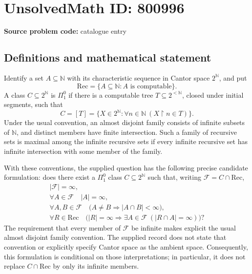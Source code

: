 \documentclass[11pt]{article}
\newcommand{\N}{\mathbb{N}}
\begin{document}
\section*{UnsolvedMath ID: 800996}
\textbf{Source problem code:} catalogue entry
\subsection{Definitions and mathematical statement}
Identify a set \(A\subseteq\N\) with its characteristic sequence in Cantor space \(2^{\N}\), and put
\[
\mathrm{Rec}=\{A\subseteq\N:A\text{ is computable}\}.
\]
A class \(C\subseteq 2^{\N}\) is \(\Pi^0_1\) if there is a computable tree \(T\subseteq 2^{<\N}\), closed under initial segments, such that
\[
C=[T]=\{X\in 2^{\N}:\forall n\in\N\ (X\upharpoonright n\in T)\}.
\]
Under the usual convention, an almost disjoint family consists of infinite subsets of \(\N\), and distinct members have finite intersection. Such a family of recursive sets is maximal among the infinite recursive sets if every infinite recursive set has infinite intersection with some member of the family.

With these conventions, the supplied question has the following precise candidate formulation: does there exist a \(\Pi^0_1\) class \(C\subseteq 2^{\N}\) such that, writing \(\mathcal F=C\cap\mathrm{Rec}\),
\[
\begin{gathered}
|\mathcal F|=\infty,\\
\forall A\in\mathcal F\quad |A|=\infty,\\
\forall A,B\in\mathcal F\quad
\bigl(A\ne B\Longrightarrow |A\cap B|<\infty\bigr),\\
\forall R\in\mathrm{Rec}\quad
\bigl(|R|=\infty\Longrightarrow
\exists A\in\mathcal F\ (|R\cap A|=\infty)\bigr)?
\end{gathered}
\]
The requirement that every member of \(\mathcal F\) be infinite makes explicit the usual almost disjoint family convention. The supplied record does not state that convention or explicitly specify Cantor space as the ambient space. Consequently, this formulation is conditional on those interpretations; in particular, it does not replace \(C\cap\mathrm{Rec}\) by only its infinite members.
\end{document}
